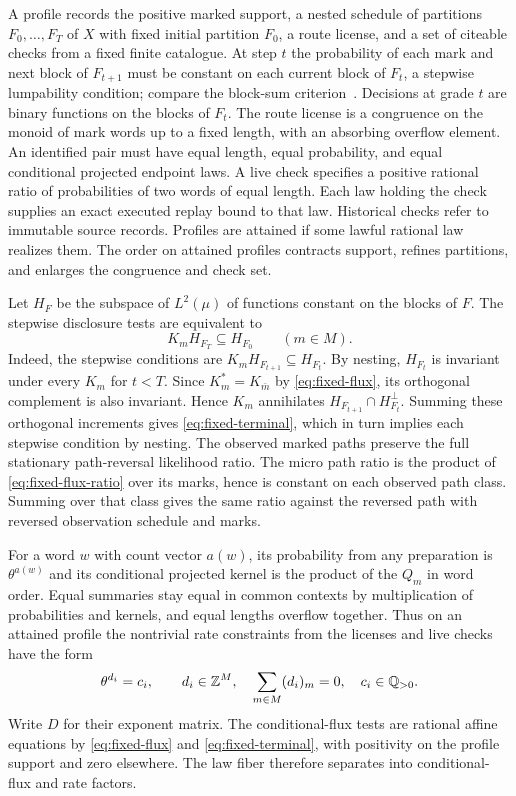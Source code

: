 A profile records the positive marked support, a nested schedule of
partitions \(F_0,\ldots,F_T\) of \(X\) with fixed initial partition
\(F_0\), a route license, and a set of citeable checks from a fixed
finite catalogue. At step \(t\) the probability of each mark and next
block of \(F_{t+1}\) must be constant on each current block of \(F_t\),
a stepwise lumpability condition; compare the block-sum
criterion~\citep[Theorem 6.3.2]{kemenysnell}.
Decisions at grade \(t\) are binary functions on the blocks of \(F_t\).
The route license is a congruence on the monoid of mark words up to
a fixed length, with an absorbing overflow element. An identified
pair must have equal length, equal probability, and equal conditional
projected endpoint laws. A live check specifies a positive rational
ratio of probabilities of two words of equal length. Each law
holding the check supplies an exact executed replay bound to that
law. Historical checks refer to immutable source records.
Profiles are attained if some lawful rational law
realizes them. The order on attained profiles contracts support,
refines partitions, and enlarges the congruence and check set.

Let \(H_F\) be the subspace of \(L^2(\mu)\) of functions constant on
the blocks of \(F\). The stepwise disclosure tests are equivalent to
\begin{equation}\label{eq:fixed-terminal}
 K_m H_{F_T}\subseteq H_{F_0}\qquad(m\in M).
\end{equation}
Indeed, the stepwise conditions are \(K_m H_{F_{t+1}}\subseteq H_{F_t}\).
By nesting, \(H_{F_t}\) is invariant under every \(K_m\) for \(t<T\).
Since \(K_m^*=K_{\bar m}\) by \eqref{eq:fixed-flux}, its orthogonal
complement is also invariant. Hence \(K_m\) annihilates
\(H_{F_{t+1}}\cap H_{F_t}^{\perp}\). Summing these orthogonal increments
gives \eqref{eq:fixed-terminal}, which in turn implies each stepwise
condition by nesting. The observed marked paths preserve the full
stationary path-reversal likelihood ratio. The micro path ratio is
the product of \eqref{eq:fixed-flux-ratio} over its marks, hence is
constant on each observed path class. Summing over that class gives
the same ratio against the reversed path with reversed observation
schedule and marks.

For a word \(w\) with count vector \(a(w)\), its probability from any
preparation is \(\theta^{a(w)}\) and its conditional projected kernel
is the product of the \(Q_m\) in word order. Equal summaries stay
equal in common contexts by multiplication of probabilities and
kernels, and equal lengths overflow together. Thus on an attained
profile the nontrivial rate constraints from the licenses and live
checks have the form
\begin{equation}\label{eq:fixed-rate-rows}
 \theta^{d_i}=c_i,\qquad
 d_i\in\mathbb Z^M,\quad \sum_{m\in M}(d_i)_m=0,\quad c_i\in\mathbb{Q}_{>0}.
\end{equation}
Write \(D\) for their exponent matrix. The conditional-flux tests
are rational affine equations by \eqref{eq:fixed-flux} and
\eqref{eq:fixed-terminal}, with positivity on the profile support
and zero elsewhere. The law fiber therefore separates into
conditional-flux and rate factors.


